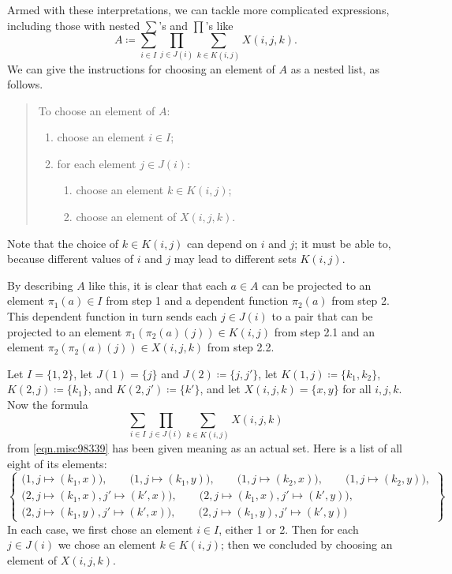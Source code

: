 \documentclass[Book-Poly]{subfiles}
\begin{document}
Armed with these interpretations, we can tackle more complicated expressions, including those with nested $\sum$'s and $\prod$'s like
\begin{equation}\label{eqn.misc98339}
A \coloneqq \sum_{i\in I}\prod_{j\in J(i)}\sum_{k\in K(i,j)}X(i,j,k).
\end{equation}
We can give the instructions for choosing an element of $A$ as a nested list, as follows.

\begin{quote}
To choose an element of $A$:
\begin{enumerate}
    \item choose an element $i \in I$;
    \item for each element $j \in J(i)$:
    \begin{enumerate}[label=\arabic*.]
        \item choose an element $k \in K(i,j)$;
        \item choose an element of $X(i,j,k)$.
    \end{enumerate}
\end{enumerate}
\end{quote}

Note that the choice of $k\in K(i,j)$ can depend on $i$ and $j$; it must be able to, because different values of $i$ and $j$ may lead to different sets $K(i,j)$.

By describing $A$ like this, it is clear that each $a \in A$ can be projected to an element $\pi_1(a) \in I$ from step 1 and a dependent function $\pi_2(a)$ from step 2.
This dependent function in turn sends each $j \in J(i)$ to a pair that can be projected to an element $\pi_1(\pi_2(a)(j)) \in K(i, j)$ from step 2.1 and an element $\pi_2(\pi_2(a)(j)) \in X(i,j,k)$ from step 2.2.

\begin{example}%
\label{ex.notation_sum_prod}

Let $I=\{1,2\}$, let $J(1)=\{j\}$ and $J(2)\coloneqq\{j,j'\}$, let $K(1,j)\coloneqq\{k_1,k_2\}$, $K(2,j)\coloneqq\{k_1\}$, and $K(2,j')\coloneqq\{k'\}$, and let $X(i,j,k)=\{x,y\}$ for all $i,j,k$. Now the formula 
\[\sum_{i\in I}\prod_{j\in J(i)}\sum_{k\in K(i,j)}X(i,j,k)\]
from \eqref{eqn.misc98339} has been given meaning as an actual set. Here is a list of all eight of its elements:
\[
\left\{
\begin{gathered}
	\big(1, j\mapsto(k_1,x)\big),\qquad
	\big(1, j\mapsto(k_1,y)\big),\qquad
	\big(1, j\mapsto(k_2,x)\big),\qquad
	\big(1, j\mapsto(k_2,y)\big),\\
	\big(2, j\mapsto(k_1,x), j'\mapsto(k',x)\big),\qquad
	\big(2, j\mapsto(k_1,x), j'\mapsto(k',y)\big),\\
	\big(2, j\mapsto(k_1,y), j'\mapsto(k',x)\big),\qquad
	\big(2, j\mapsto(k_1,y), j'\mapsto(k',y)\big)
\end{gathered}
\right\}
\]
In each case, we first chose an element $i\in I$, either 1 or 2. Then for each $j\in J(i)$ we chose an element $k\in K(i,j)$; then we concluded by choosing an element of $X(i,j,k)$.
\end{example}
\end{document}
